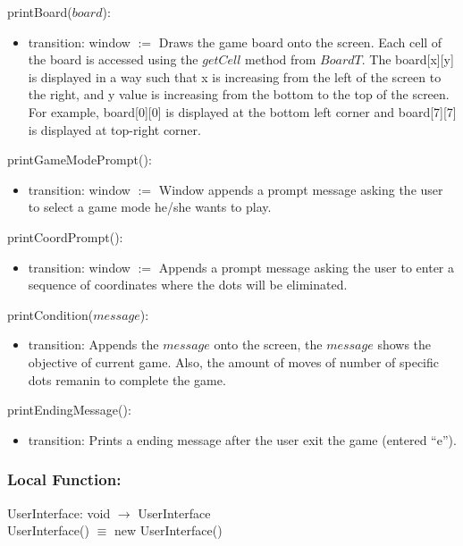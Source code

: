\documentclass[12pt]{article}
\begin{document}
\noindent printBoard($board$):
\begin{itemize}
\item transition: window $:=$ Draws the game board onto the screen. Each cell of the board
                  is accessed using the $getCell$ method from $BoardT$. The board[x][y] is displayed 
                  in a way such that x is increasing from the left of the screen to the right,
                  and y value is increasing from the bottom to the top of the screen. For example,
                  board[0][0] is displayed at the bottom left corner and board[7][7] is displayed 
                  at top-right corner. 
\end{itemize}

\noindent printGameModePrompt():
\begin{itemize}
\item transition: window $:=$ Window appends a prompt message asking the user to select a
                              game mode he/she wants to play.
\end{itemize}

\noindent printCoordPrompt():
\begin{itemize}
\item transition: window $:=$ Appends a prompt message asking the user to enter a sequence
                              of coordinates where the dots will be eliminated.
\end{itemize}

\noindent printCondition($message$):
\begin{itemize}
\item transition: Appends the $message$ onto the screen, the $message$ shows the objective of current game. Also, the amount of moves
                  of number of specific dots remanin to complete the game.
\end{itemize}

\noindent printEndingMessage():
\begin{itemize}
\item transition: Prints a ending message after the user exit the game (entered ``e'').
\end{itemize}

\subsubsection*{Local Function:}

UserInterface: void $\rightarrow$ UserInterface \\
UserInterface() $\equiv$ new UserInterface()
\end{document}
